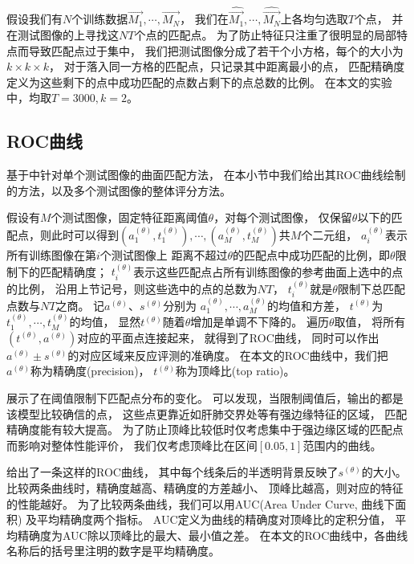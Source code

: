 假设我们有$N$个训练数据$\vec{M_1},\cdots,\vec{M_N}$，
我们在$\hat{\vec{M_1}},\cdots,\hat{\vec{M_N}}$上各均匀选取$T$个点，
并在测试图像的上寻找这$NT$个点的匹配点。
为了防止特征只注重了很明显的局部特点而导致匹配点过于集中，
我们把测试图像分成了若干个小方格，每个的大小为$k\times k \times k$，
对于落入同一方格的匹配点，只记录其中距离最小的点，
匹配精确度定义为这些剩下的点中成功匹配的点数占剩下的点总数的比例。
在本文的实验中，均取$T=3000, k=2$。


\subsection{ROC曲线}
基于中针对单个测试图像的曲面匹配方法，
在本小节中我们给出其ROC曲线绘制的方法，以及多个测试图像的整体评分方法。

假设有$M$个测试图像，固定特征距离阈值$\theta$，对每个测试图像，
仅保留$\theta$以下的匹配点，则此时可以得到$(a_1^{(\theta)},
t_1^{(\theta)}),\cdots,(a_M^{(\theta)}, t_M^{(\theta)})$共$M$个二元组，
$a_i^{(\theta)}$表示所有训练图像在第$i$个测试图像上
距离不超过$\theta$的匹配点中成功匹配的比例，即$\theta$限制下的匹配精确度；
$t_i^{(\theta)}$表示这些匹配点占所有训练图像的参考曲面上选中的点的比例，
沿用上节记号，则这些选中的点的总数为$NT$，
$t_i^{(\theta)}$就是$\theta$限制下总匹配点数与$NT$之商。
记$a^{(\theta)}$、$s^{(\theta)}$分别为
$a_1^{(\theta)},\cdots,a_M^{(\theta)}$的均值和方差，
$t^{(\theta)}$为$t_1^{(\theta)},\cdots,t_M^{(\theta)}$的均值，
显然$t^{(\theta)}$随着$\theta$增加是单调不下降的。
遍历$\theta$取值，
将所有$(t^{(\theta)}, a^{(\theta)})$对应的平面点连接起来，
就得到了ROC曲线，
同时可以作出$a^{(\theta)} \pm s^{(\theta)}$的对应区域来反应评测的准确度。
在本文的ROC曲线中，我们把$a^{(\theta)}$称为精确度(precision)，
$t^{(\theta)}$称为顶峰比(top ratio)。

展示了在阈值限制下匹配点分布的变化。
可以发现，当限制阈值后，输出的都是该模型比较确信的点，
这些点更靠近如肝肺交界处等有强边缘特征的区域，
匹配精确度能有较大提高。
为了防止顶峰比较低时仅考虑集中于强边缘区域的匹配点而影响对整体性能评价，
我们仅考虑顶峰比在区间$[0.05, 1]$范围内的曲线。

给出了一条这样的ROC曲线，
其中每个线条后的半透明背景反映了$s^{(\theta)}$的大小。
比较两条曲线时，精确度越高、精确度的方差越小、
顶峰比越高，则对应的特征的性能越好。
为了比较两条曲线，我们可以用AUC(Area Under Curve, 曲线下面积)
及平均精确度两个指标。
AUC定义为曲线的精确度对顶峰比的定积分值，
平均精确度为AUC除以顶峰比的最大、最小值之差。
在本文的ROC曲线中，各曲线名称后的括号里注明的数字是平均精确度。

